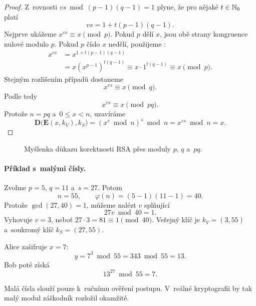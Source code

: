 \begin{proof}
    Z~rovnosti $vs\bmod(p-1)(q-1)=1$ plyne, že pro nějaké $t\in\mathbb{N}_0$ platí
    \[
        vs=1+t(p-1)(q-1).
    \]
    Nejprve ukážeme $x^{vs}\equiv x\pmod p$. Pokud $p$ dělí $x$, jsou obě strany kongruence nulové modulo $p$. Pokud $p$ číslo $x$ nedělí, použijeme :
    \begin{align*}
        x^{vs}
        &=
        x^{1+t(p-1)(q-1)}\\
        &=
        x\left(x^{p-1}\right)^{t(q-1)}
        \equiv
        x\cdot 1^{t(q-1)}
        \equiv x
        \pmod p.
    \end{align*}
    Stejným rozlišením případů dostaneme
    \[
        x^{vs}\equiv x\pmod q.
    \]
    Podle  tedy
    \[
        x^{vs}\equiv x\pmod{pq}.
    \]
    Protože $n=pq$ a~$0\leqslant x<n$, uzavíráme
    \[
        \mathbf{D}\bigl(\mathbf{E}(x,k_V),k_S\bigr)
        =
        \left(x^v\bmod n\right)^s\bmod n
        =
        x^{vs}\bmod n
        =
        x.
    \]
\end{proof}

\begin{figure}[ht]
    \centering
    
    \caption{Myšlenka důkazu korektnosti RSA přes moduly $p$, $q$ a~$pq$.}
    \label{fig:krypto-rsa-korektnost}
\end{figure}

\paragraph{Příklad s~malými čísly.}

\begin{example}
    Zvolme $p=5$, $q=11$ a~$s=27$. Potom
    \[
        n=55,
        \qquad
        \varphi(n)=(5-1)(11-1)=40.
    \]
    Protože $\operatorname{gcd}(27,40)=1$, můžeme nalézt $v$ splňující
    \[
        27v\bmod 40=1.
    \]
    Vyhovuje $v=3$, neboť $27\cdot 3=81\equiv 1\pmod{40}$. Veřejný klíč je $k_V=(3,55)$ a~soukromý klíč $k_S=(27,55)$.

    Alice zašifruje $x=7$:
    \[
        y=7^3\bmod 55=343\bmod 55=13.
    \]
    Bob poté získá
    \[
        13^{27}\bmod 55=7.
    \]
\end{example}

Malá čísla slouží pouze k~ručnímu ověření postupu. V~reálné kryptografii by tak malý modul záškodník rozložil okamžitě.

